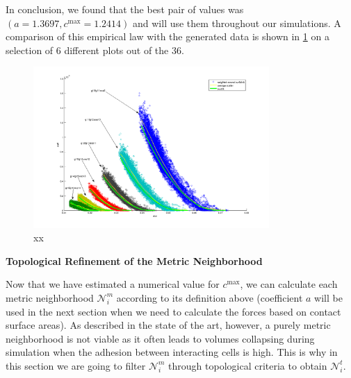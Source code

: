 In conclusion, we found that the best pair of values was $(a=1.3697 , c^{\mathrm{max}}=1.2414)$ and will use them throughout our simulations. A comparison of this empirical law with the generated data is shown in \ref{spatial_neighb_multi_scatter_gp1_gp2_exp9_14} on a selection of 6 different plots out of the 36.
\begin{figure}
\begin{center}
\includegraphics[width=0.8\textwidth]{../../images/MECAGEN/spatial_neighb/multi_scatter_gp1_gp2_exp9_14.png}
\end{center}
\caption{xx}
\label{spatial_neighb_multi_scatter_gp1_gp2_exp9_14}
\end{figure}

\textbf{Topological Refinement of the Metric Neighborhood}

Now that we have estimated a numerical value for $c^{\mathrm{max}}$, we can calculate each metric neighborhood $\mathcal{N}^m_i$ according to its definition above (coefficient $a$ will be used in the next section when we need to calculate the forces based on contact surface areas). As described in the state of the art, however, a purely metric neighborhood is not viable as it often leads to volumes collapsing during simulation when the adhesion between interacting cells is high. This is why in this section we are going to filter $\mathcal{N}^m_i$ through topological criteria to obtain $\mathcal{N}^t_i$.

